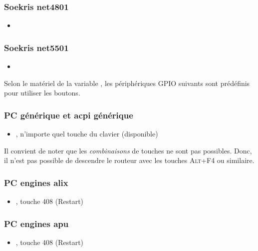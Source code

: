 \subsubsection{Soekris net4801}
\begin{itemize}
  \item {}
\end{itemize}

\subsubsection{Soekris net5501}
\begin{itemize}
  \item {}
\end{itemize}

  Selon le matériel de la variable , les périphériques GPIO
  suivants sont prédéfinis pour utiliser les boutons.

\subsubsection{PC générique et acpi générique}
\begin{itemize}
  \item {}, n'importe quel touche du clavier (disponible)
\end{itemize}

Il convient de noter que les \emph{combinaisons} de touches ne sont pas possibles.
Donc, il n'est pas possible de descendre le routeur avec les touches \textsc{Alt+F4}
ou similaire.

\subsubsection{PC engines alix}
\begin{itemize}
  \item {}, touche 408 (Restart)
\end{itemize}

\subsubsection{PC engines apu}
\begin{itemize}
  \item {}, touche 408 (Restart)
\end{itemize}

